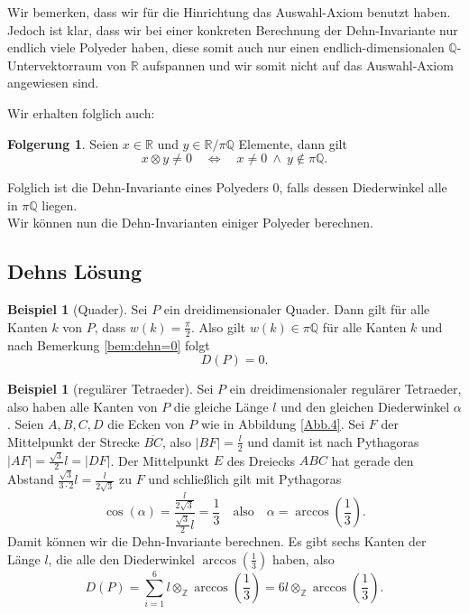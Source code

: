 \documentclass[11pt,titlepage]{article}
\newcommand{\setZ}{\mathbb{Z}}
\newcommand{\setQ}{\mathbb{Q}}
\newcommand{\setR}{\mathbb{R}}
\theoremstyle{definition}
\newtheorem{corollary}[theorem]{Folgerung}
\newtheorem{example}[theorem]{Beispiel}
\theoremstyle{remark}
\begin{document}
	Wir bemerken, dass wir für die Hinrichtung das Auswahl-Axiom 
	benutzt haben. Jedoch ist klar, dass wir bei einer konkreten Berechnung der 
	Dehn-Invariante nur endlich viele Polyeder haben, diese somit auch 
	nur einen endlich-dimensionalen $\setQ$-Untervektorraum von $\setR$ aufspannen und wir somit nicht auf das Auswahl-Axiom angewiesen sind.
	
	Wir erhalten folglich auch:
	
	\begin{corollary}
		Seien $x\in\setR$ und $y\in\setR/\pi\setQ$ Elemente, dann gilt
		\[ x\otimes y\neq0\quad\Leftrightarrow\quad x\neq 0 \ \land\ y\notin\pi\setQ. \]
	\end{corollary}
	
	Folglich ist die Dehn-Invariante eines Polyeders $0$, falls dessen Diederwinkel alle in $\pi\setQ$ liegen. \\
	
	Wir können nun die Dehn-Invarianten einiger Polyeder berechnen.
	
	\subsection{Dehns Lösung}
	
	\begin{example}[Quader] \label{exp:quader}
		Sei $P$ ein dreidimensionaler Quader. Dann gilt für alle Kanten $k$ von $P$, dass $w(k)=\frac{\pi}{2}$. 
		Also gilt $w(k)\in \pi\setQ$ für alle Kanten $k$ und nach Bemerkung \ref{bem:dehn=0} folgt
		\[ D(P)=0. \]
	\end{example}
	
	\begin{example}[regulärer Tetraeder] \label{exp:regTetr}
		Sei $P$ ein dreidimensionaler regulärer Tetraeder, also haben alle Kanten von $P$ die gleiche Länge $l$ und 
		den gleichen Diederwinkel $\alpha$. Seien $A,B,C,D$ die Ecken von $P$ wie in Abbildung \ref{Abb.4}. 
		Sei $F$ der Mittelpunkt der Strecke $\overline{BC}$, also $|BF|=\frac{l}{2}$ und damit ist nach Pythagoras 
		$|AF|=\frac{\sqrt{3}}{2}l=|DF|$. Der Mittelpunkt $E$ des Dreiecks $ABC$ hat gerade den Abstand 
		$\frac{\sqrt{3}}{3 \cdot 2}l=\frac{l}{2\sqrt{3}}$ zu $F$ und schließlich gilt mit Pythagoras
		\[\cos(\alpha)=\frac{\frac{l}{2\sqrt{3}}}{\frac{\sqrt{3}}{2}l}=\frac{1}{3}\quad\text{also}
		\quad \alpha=\arccos\left(\frac{1}{3}\right). \]
		Damit können wir die Dehn-Invariante berechnen. Es gibt sechs Kanten der Länge $l$, die alle den 
		Diederwinkel $\arccos\left(\frac{1}{3}\right)$ haben, also
		\[ D(P)=\sum_{i=1}^6 l\otimes_{\setZ}\arccos\left(\frac{1}{3}\right)=6l\otimes_{\setZ}\arccos\left(\frac{1}{3}\right).\]
	\end{example}
	
\end{document}
